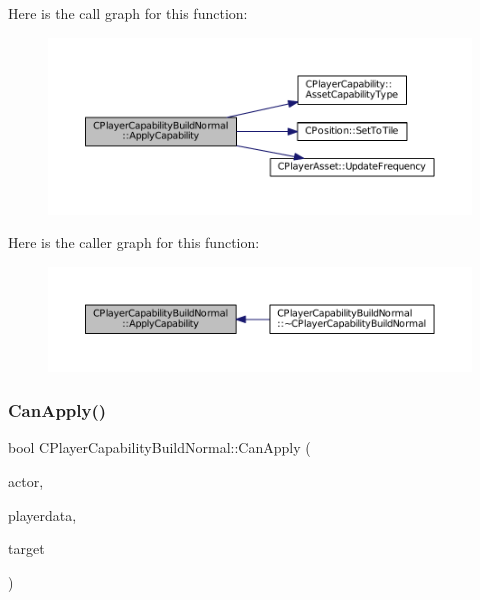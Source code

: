 Here is the call graph for this function\+:\nopagebreak
\begin{figure}[H]
\begin{center}
\leavevmode
\includegraphics[width=350pt]{classCPlayerCapabilityBuildNormal_afc2fbda17580385a4028d44cd03c9149_cgraph}
\end{center}
\end{figure}
Here is the caller graph for this function\+:\nopagebreak
\begin{figure}[H]
\begin{center}
\leavevmode
\includegraphics[width=350pt]{classCPlayerCapabilityBuildNormal_afc2fbda17580385a4028d44cd03c9149_icgraph}
\end{center}
\end{figure}
\hypertarget{classCPlayerCapabilityBuildNormal_a1a8c6fdd9d8a91ecb7417163279e2276}{}\label{classCPlayerCapabilityBuildNormal_a1a8c6fdd9d8a91ecb7417163279e2276} 
\subsubsection{\texorpdfstring{Can\+Apply()}{CanApply()}}
{\footnotesize\ttfamily bool C\+Player\+Capability\+Build\+Normal\+::\+Can\+Apply (\begin{DoxyParamCaption}\item[{std\+::shared\+\_\+ptr$<$ \hyperlink{classCPlayerAsset}{C\+Player\+Asset} $>$}]{actor,  }\item[{std\+::shared\+\_\+ptr$<$ \hyperlink{classCPlayerData}{C\+Player\+Data} $>$}]{playerdata,  }\item[{std\+::shared\+\_\+ptr$<$ \hyperlink{classCPlayerAsset}{C\+Player\+Asset} $>$}]{target }\end{DoxyParamCaption})\hspace{0.3cm}{\ttfamily [virtual]}}



